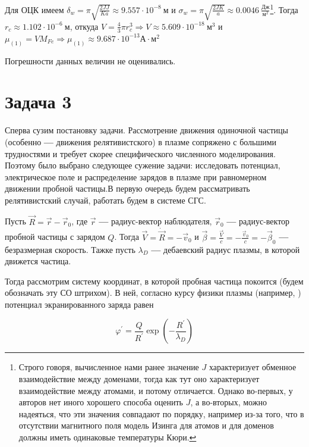 \documentclass[oneside,final,14pt]{extarticle}
\begin{document}
	Для ОЦК имеем $\delta_{w}=\pi \sqrt{\frac{2JJ}{Ka}}\approx 9.557\cdot 10^{-8} \ \text{м}$ и $\sigma_{w}=\pi \sqrt{\frac{2JK}{a}}\approx 0.0046 \ \frac{\text{Дж}}{\text{м}^2}$\footnote{Строго говоря, вычисленное нами ранее значение $J$ характеризует обменное взаимодействие между доменами, тогда как тут оно характеризует взаимодействие между атомами, и потому отличается. Однако во-первых, у авторов нет иного хорошего способа оценить $J$, а во-вторых, можно надеяться, что эти значения совпадают по порядку, например из-за того, что в отсутствии магнитного поля модель Изинга для атомов и для доменов должны иметь одинаковые температуры Кюри.}. Тогда $r_{c} \approx 1.102 \cdot 10^{-6} \ \text{м}$, откуда $V=\frac{4}{3}\pi r_{c}^3 \Rightarrow \boxed{V \approx 5.609 \cdot 10^{-18} \ \text{м}^3}$ и $\mu_{(1)}=VM_{Fe} \Rightarrow \boxed{\mu_{(1)}\approx 9.687 \cdot 10^{-13} \text{А}\cdot\text{м}^2}$

	Погрешности данных величин не оценивались.
	\newpage
	
	\section{Задача 3}
	
	Сперва сузим постановку задачи. Рассмотрение движения одиночной частицы (особенно \textbf{---} движения релятивистского) в плазме сопряжено с большими трудностями и требует скорее специфического численного моделирования. Поэтому было выбрано следующее сужение задачи: исследовать потенциал, электрическое поле и распределение зарядов в плазме при равномерном движении пробной частицы.В первую очередь будем рассматривать релятивистский случай, работать будем в системе СГС.  

	Пусть $\vec R=\vec r - \vec r_{0}$, где $\vec r$ \textbf{---} радиус-вектор наблюдателя, $\vec r_{0}$ \textbf{---} радиус-вектор пробной частицы с зарядом $Q$. Тогда $\vec V = \dot {\vec R}=-\vec v_{0}$ и $\vec \beta = \frac{\vec V}{c}=-\frac{\vec v_{0}}{c}=-\vec \beta_{0}$ \textbf{---} безразмерная скорость. Тажке пусть $\lambda_D$ \textbf{---} дебаевский радиус плазмы, в которой движется частица. 
	
	Тогда рассмотрим систему координат, в которой пробная частица покоится (будем обозначать эту СО штрихом). В ней, согласно курсу физики плазмы (например, \cite{plasma}) потенциал экранированного заряда равен 

$$\varphi^{\prime} = \frac{Q}{R^{\prime}}\exp\left(-\frac{R^{\prime}}{\lambda_D}\right)$$
\end{document}
